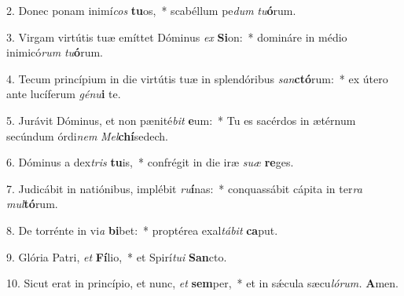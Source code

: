 \item 2. Donec ponam inimí\hspace{0.03em}\textit{cos} \textbf{tu}os,~* scabéllum pe\hspace{0.03em}\textit{dum} \textit{tu}\textbf{ó}rum.
\item 3. Virgam virtútis tuæ emíttet Dóminus \textit{ex} \textbf{Si}on:~* domináre in médio inimicó\textit{rum} \textit{tu}\textbf{ó}rum.
\item 4. Tecum princípium in die virtútis tuæ in splendóribus \textit{san}\textbf{ctó}rum:~* ex útero ante lucíferum \textit{génu}\textbf{i} te.
\item 5. Jurávit Dóminus, et non pænité\textit{bit} \textbf{e}um:~* Tu es sacérdos in ætérnum secúndum órdi\hspace{0.03em}\textit{nem} \textit{Mel}\textbf{chí}sedech.
\item 6. Dóminus a dex\hspace{0.03em}\textit{tris} \textbf{tu}is,~* confrégit in die iræ \textit{suæ} \textbf{re}ges.
\item 7. Judicábit in natiónibus, implébit \textit{ru}\textbf{í}nas:~* conquassábit cápita in ter\textit{ra} \textit{mul}\textbf{tó}rum.
\item 8. De torrénte in vi\textit{a} \textbf{bi}bet:~* proptérea exal\textit{tábit} \textbf{ca}put.
\item 9. Glória Patri, \textit{et} \textbf{Fí}lio,~* et Spirí\hspace{0.03em}\textit{tui} \textbf{San}cto.
\item 10. Sicut erat in princípio, et nunc, \textit{et} \textbf{sem}per,~* et in sǽcula sæcu\hspace{0.03em}\textit{lórum.} \textbf{A}men.